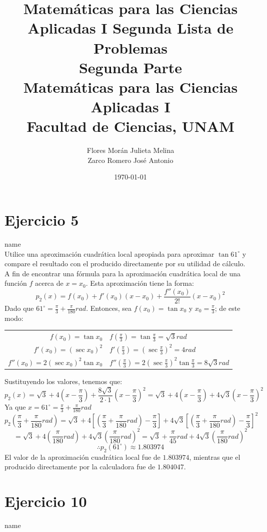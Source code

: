\documentclass[12pt]{article}
\title{Matemáticas para las Ciencias Aplicadas I}
\title{
	Segunda Lista de Problemas \\
	\textbf{Segunda Parte} \\
	\vspace{1ex}
	\large Matemáticas para las Ciencias Aplicadas I \\
	Facultad de Ciencias, UNAM}
\date{\today}
\author{Flores Morán Julieta Melina \\ Zarco Romero José Antonio}
\begin{document}
\maketitle


\section{Ejercicio 5} name \\

Utilice una aproximación cuadrática local apropiada para aproximar $\tan 61^{\circ}$ y compare el resultado con el producido directamente por su utilidad de cálculo. \\

A fin de encontrar una fórmula para la aproximación cuadrática local de una función $f$ acerca de $x=x_0$. Esta aproximación tiene la forma:
\[p_2(x)=f(x_0)+f'(x_0)(x-x_0)+\frac{f''(x_0)}{2!}(x-x_0)^2\]
Dado que $61^{\circ} = \frac{\pi}{3} + \frac{\pi}{180} rad$. Entonces, sea $f(x_0)=\tan x_0$ y $x_0=\frac{\pi}{3}$; de este modo:
\begin{center}
\begin{tabular}{r l}
$f(x_0)=\tan x_0$ & $f(\frac{\pi}{3})=\tan \frac{\pi}{3}=\sqrt 3 rad$ \\
$f'(x_0)=(\sec x_0)^2$ & $f'(\frac{\pi}{3})=(\sec \frac{\pi}{3})^2=4 rad$ \\
$f''(x_0)=2 (\sec x_0)^2 \tan x_0$ & $f''(\frac{\pi}{3})=2 (\sec \frac{\pi}{3})^2 \tan \frac{\pi}{3}=8\sqrt 3 rad$ \\
\end{tabular}
\end{center}
Sustituyendo los valores, tenemos que:
\[
p_2(x)=\sqrt 3 + 4(x-\frac{\pi}{3}) + \frac{8 \sqrt 3}{2 \cdot 1}(x-\frac{\pi}{3})^2
=\sqrt 3 + 4(x-\frac{\pi}{3}) + 4 \sqrt 3(x-\frac{\pi}{3})^2
\]
Ya que $x=61^{\circ}=\frac{\pi}{3} + \frac{\pi}{180}rad$
\[
p_2(\frac{\pi}{3} + \frac{\pi}{180}rad)
=\sqrt 3 + 4[(\frac{\pi}{3} + \frac{\pi}{180}rad)-\frac{\pi}{3}] + 4 \sqrt 3[(\frac{\pi}{3} + \frac{\pi}{180}rad)-\frac{\pi}{3}]^2
\]
\[
=\sqrt 3 + 4(\frac{\pi}{180}rad) + 4 \sqrt 3(\frac{\pi}{180}rad)^2
= \sqrt 3 + \frac{\pi}{45}rad + 4 \sqrt 3(\frac{\pi}{180}rad)^2
\]
\[\therefore p_2(61^{\circ}) \approx 1.803974\]
El valor de la aproximación cuadrática local fue de $1.803974$, mientras que el producido directamente por la calculadora fue de $1.804047$.

\section{Ejercicio 10} name \\
\end{document}
